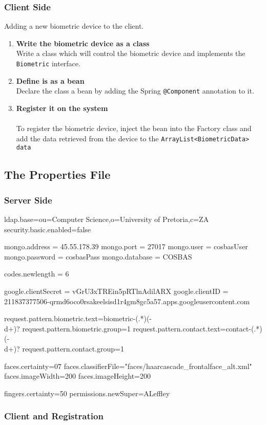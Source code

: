 \subsubsection{Client Side}
Adding a new biometric device to the client.
\begin{enumerate}
	\item \textbf{Write the biometric device as a class}
	\\Write a class which will control the biometric device and implements the \verb|Biometric| interface.
	\item \textbf{Define is as a bean}
	\\Declare the class a bean by adding the Spring  \verb!@Component! annotation to it.
	\item \textbf{Register it on the system} \\
	\\To register the biometric device, inject the bean into the Factory class and add the data retrieved from the device to the \verb|ArrayList<BiometricData> data|
\end{enumerate}

\subsection{The Properties File}
\subsubsection{Server Side}
ldap.base=ou=Computer Science,o=University of Pretoria,c=ZA
security.basic.enabled=false

mongo.address = 45.55.178.39
mongo.port = 27017
mongo.user = cosbasUser
mongo.password = cosbasPass
mongo.database = COSBAS

codes.newlength = 6

google.clientSecret = vGrU3xTREin5pRTlnAdilARX
google.clientID = 211837377506-qrmd6oco0rsakeelsisd1r4gm8gc5a57.apps.googleusercontent.com

request.pattern.biometric.text=biometric-(.*)(-\\d+)?
request.pattern.biometric.group=1
request.pattern.contact.text=contact-(.*)(-\\d+)?
request.pattern.contact.group=1

faces.certainty=0\.7
faces.classifierFile="faces/haarcascade_frontalface_alt.xml"
faces.imageWidth=200
faces.imageHeight=200

fingers.certainty=50
permissions.newSuper=ALeffley

\subsubsection{Client and Registration}
